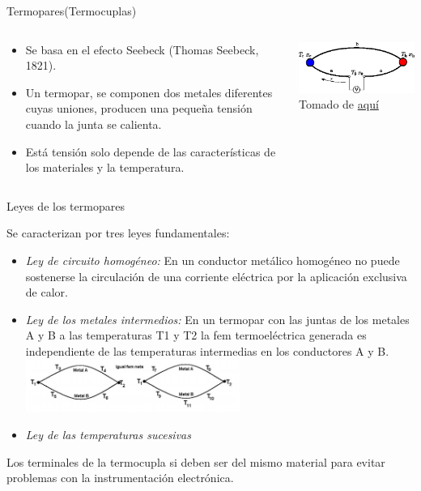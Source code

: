 \documentclass[aspectratio=169]{beamer}
\begin{document}
\begin{frame}{Termopares(Termocuplas)}
    \begin{columns}[c, onlytextwidth]
        \begin{column}{0.55\textwidth}
            \begin{itemize}
                \item Se basa en el efecto Seebeck (Thomas Seebeck, 1821). 
                \item Un termopar, se componen dos metales diferentes cuyas uniones, producen una pequeña tensión cuando la junta se calienta. 
                \item Está tensión solo depende de las características de los materiales y la temperatura. 
            \end{itemize}
        \end{column}
        \begin{column}{0.40\textwidth}
        \includegraphics[width=6cm]{fig/seebeekc.png}
            \tiny{Tomado de \href{https://www.iue.tuwien.ac.at/phd/mwagner/node14.html}{aquí}}
        \end{column}
    \end{columns}
\end{frame}

\begin{frame}{Leyes de los termopares}

    Se caracterizan por tres leyes fundamentales:\\[8pt]
    \begin{itemize}
        \item \emph{Ley de circuito homogéneo: } En un conductor metálico homogéneo no puede sostenerse la circulación de una corriente eléctrica por la aplicación exclusiva de calor.
        \item \emph{Ley de los metales intermedios: } En un termopar con las juntas de los metales A y B a las temperaturas T1 y T2 la fem termoeléctrica generada es independiente de las temperaturas intermedias en los conductores A y B.
        \includegraphics[width=7cm]{fig/ley2.PNG}
        \item \emph{Ley de las temperaturas sucesivas}
    \end{itemize}
    Los terminales de la termocupla si deben ser del mismo material para evitar problemas con la instrumentación electrónica.

\end{frame}
\end{document}
